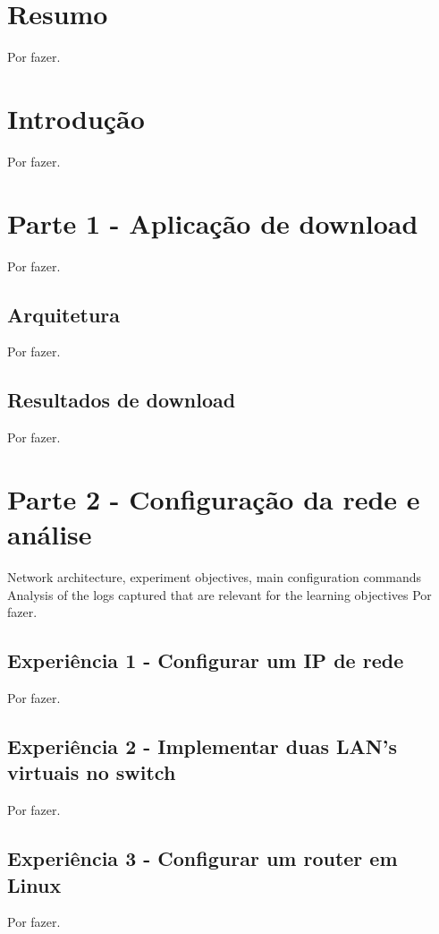 \documentclass[a4paper]{article}
\begin{document}

\newpage

\section*{Resumo}
Por fazer.

\newpage

\tableofcontents
\newpage

\section{Introdução}
Por fazer.

\section{Parte 1 - Aplicação de download}
Por fazer.

\subsection{Arquitetura}
Por fazer.

\subsection{Resultados de download}
Por fazer.

\section{Parte 2 - Configuração da rede e análise}
Network architecture, experiment objectives, main configuration commands
Analysis of the logs captured that are relevant for the learning objectives
Por fazer.

\subsection{Experiência 1 - Configurar um IP de rede}
Por fazer.

\subsection{Experiência 2 - Implementar duas LAN's virtuais no switch}
Por fazer.

\subsection{Experiência 3 - Configurar um router em Linux}
Por fazer.
\end{document}
